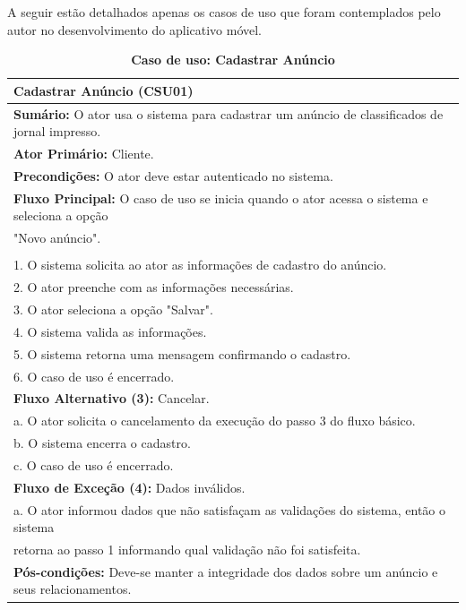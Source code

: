 \documentclass[
	12pt,				%
	openright,			%
	oneside,			%
	a4paper,			%
	chapter=TITLE,		%
	section=TITLE,		%
	english,			%
	french,				%
	spanish,			%
	brazil				%
	]{abntex2}
\begin{document}
A seguir estão detalhados apenas os casos de uso que foram contemplados pelo autor no desenvolvimento do aplicativo móvel.

\begin{table}[h!]
	\center\scriptsize
	\caption{\textbf{Caso de uso: Cadastrar Anúncio}}
	\begin{tabular}{|l|} \hline \label{tab-csu-cadastrarAnuncio}
		\textbf{Cadastrar Anúncio (CSU01)} \\ \hline
		
		\textbf{Sumário:} O ator usa o sistema para cadastrar um anúncio de classificados de jornal impresso. \\
		\textbf{Ator Primário:} Cliente. \\
		\textbf{Precondições:} O ator deve estar autenticado no sistema. \\ \hline
		
		\textbf{Fluxo Principal:} O caso de uso se inicia quando o ator acessa o sistema e seleciona a opção \\"Novo anúncio". \\ \\

		
		1.	O sistema solicita ao ator as informações de cadastro do anúncio. \\
		2.	O ator preenche com as informações necessárias. \\
		3.  O ator seleciona a opção "Salvar". \\
		4.  O sistema valida as informações. \\
		5.  O sistema retorna uma mensagem confirmando o cadastro. \\
		6.	O caso de uso é encerrado. \\ \hline

		\textbf{Fluxo Alternativo (3):} Cancelar.\\ 
		a. O ator solicita o cancelamento da execução do passo 3 do fluxo básico.\\
		b. O sistema encerra o cadastro. \\
		c. O caso de uso é encerrado. \\ \hline

		\textbf{Fluxo de Exceção (4):} Dados inválidos.\\
		a. O ator informou dados que não satisfaçam as validações do sistema, então o sistema \\ retorna ao passo 1 informando qual validação não foi satisfeita.\\ \hline
		
		\textbf{Pós-condições:} Deve-se manter a integridade dos dados sobre um anúncio e seus relacionamentos. \\ \hline
				
	\end{tabular}
\end{table}
\end{document}
